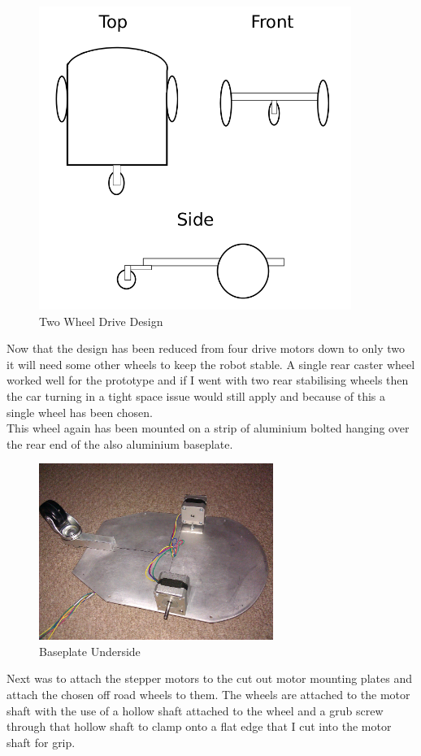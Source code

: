 \begin{figure}[H]
\centering
        \includegraphics[width=4.0in]  {Images/second-design.png}
        \caption{Two Wheel Drive Design}
        \label{Two Wheel Drive Design}
\end{figure}
Now that the design has been reduced from four drive motors down to only two it will need some other wheels to keep the robot stable.  A single rear caster wheel worked well for the prototype and if I went with two rear stabilising wheels then the car turning in a tight space issue would still apply and because of this a single wheel has been chosen.
\\This wheel again has been mounted on a strip of aluminium bolted hanging over the rear end of the also aluminium baseplate.
\begin{figure}[H]
\centering
        \includegraphics[width=3.0in]  {Images/baseplate-underside.jpg}
        \caption{Baseplate Underside}
        \label{Baseplate Underside}
\end{figure}
Next was to attach the stepper motors to the cut out motor mounting plates and attach the chosen off road wheels to them.  The wheels are attached to the motor shaft with the use of a hollow shaft attached to the wheel and a grub screw through that hollow shaft to clamp onto a flat edge that I cut into the motor shaft for grip.

